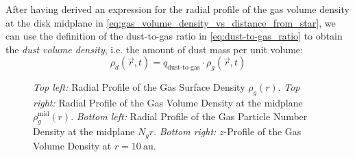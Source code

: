         After having derived an expression for 
        the radial profile of 
        the gas volume density at 
        the disk midplane %
        in \cref{eq:gas_volume_density_vs_distance_from_star}, 
        we can use the definition of 
        the dust-to-gas ratio 
        in \cref{eq:dust-to-gas_ratio}
        to obtain 
        the \textit{dust volume density}, 
        i.e. the amount of dust mass per unit volume:
        \begin{equation}
            \rho_d(\vec r, t) = q_\text{dust-to-gas} \cdot \rho_g(\vec r, t)
        \end{equation}


        \clearpage

        \begin{figure}[h!]
            \caption{
                \textit{Top left:} 
                    Radial Profile of the Gas Surface Density $\rho_g(r)$.
                \textit{Top right:} 
                    Radial Profile of the Gas Volume Density at the midplane $\rho_g^\text{mid}(r)$.
                \textit{Bottom left:} 
                    Radial Profile of the Gas Particle Number Density at the midplane $N_gr$. 
                \textit{Bottom right:}
                    $z$-Profile of the Gas Volume Density at $r=10\ \text{au}$.
            }
        \end{figure} 






